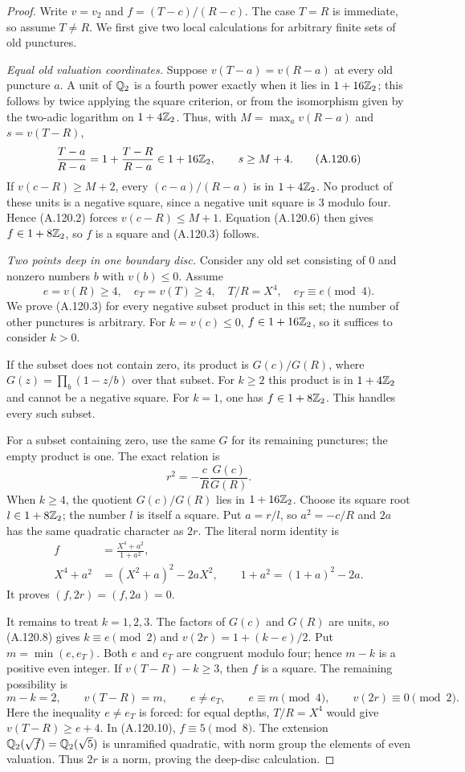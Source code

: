 \begin{proof}
Write $v=v_2$ and $f=(T-c)/(R-c)$.
The case $T=R$ is immediate, so assume $T\ne R$.
We first give two local calculations for arbitrary finite
sets of old punctures.

\emph{Equal old valuation coordinates.}
Suppose $v(T-a)=v(R-a)$ at every old puncture $a$.
A unit of $\mathbb Q_2$ is a fourth power exactly when it lies
in $1+16\mathbb Z_2$; this follows by twice applying the square
criterion, or from the isomorphism given by the two-adic
logarithm on $1+4\mathbb Z_2$.
Thus, with $M=\max_a v(R-a)$ and $s=v(T-R)$,
\[
       \frac{T-a}{R-a}=1+\frac{T-R}{R-a}\in1+16\mathbb Z_2,
                           \qquad s\ge M+4.
\tag{A.120.6}
\]
If $v(c-R)\ge M+2$, every $(c-a)/(R-a)$ is in
$1+4\mathbb Z_2$.  No product of these units is a negative
square, since a negative unit square is $3$ modulo four.
Hence (A.120.2) forces $v(c-R)\le M+1$.
Equation (A.120.6) then gives $f\in1+8\mathbb Z_2$, so $f$ is
a square and (A.120.3) follows.

\emph{Two points deep in one boundary disc.}
Consider any old set consisting of $0$ and nonzero numbers
$b$ with $v(b)\le0$.
Assume
\[
             e=v(R)\ge4,\quad e_T=v(T)\ge4,
             \quad T/R=X^4,\quad e_T\equiv e\pmod4.
\tag{A.120.7}
\]
We prove (A.120.3) for every negative subset product in
this set; the number of other punctures is arbitrary.
For $k=v(c)\le0$, $f\in1+16\mathbb Z_2$, so it suffices to
consider $k>0$.

If the subset does not contain zero, its product is
$G(c)/G(R)$, where
$G(z)=\prod_b(1-z/b)$ over that subset.
For $k\ge2$ this product is in $1+4\mathbb Z_2$ and cannot be
a negative square.  For $k=1$, one has $f\in1+8\mathbb Z_2$.
This handles every such subset.

For a subset containing zero, use the same $G$ for its
remaining punctures; the empty product is one.
The exact relation is
\[
                    r^2=-\frac cR\frac{G(c)}{G(R)}.
\tag{A.120.8}
\]
When $k\ge4$, the quotient $G(c)/G(R)$ lies in
$1+16\mathbb Z_2$.  Choose its square root $l\in1+8\mathbb Z_2$;
the number $l$ is itself a square.
Put $a=r/l$, so $a^2=-c/R$ and $2a$ has the same
quadratic character as $2r$.
The literal norm identity is
\[
 \begin{split}
 f&=\frac{X^4+a^2}{1+a^2},\\
 X^4+a^2&=(X^2+a)^2-2aX^2,
       \qquad 1+a^2=(1+a)^2-2a.
 \end{split}
\tag{A.120.9}
\]
It proves $(f,2r)=(f,2a)=0$.

It remains to treat $k=1,2,3$.
The factors of $G(c)$ and $G(R)$ are units, so
(A.120.8) gives $k\equiv e\pmod2$ and
$v(2r)=1+(k-e)/2$.
Put $m=\min(e,e_T)$.
Both $e$ and $e_T$ are congruent modulo four; hence
$m-k$ is a positive even integer.
If $v(T-R)-k\ge3$, then $f$ is a square.
The remaining possibility is
\[
 m-k=2,\qquad v(T-R)=m,\qquad
 e\ne e_T,\qquad e\equiv m\pmod4,
                       \qquad v(2r)\equiv0\pmod2.
\tag{A.120.10}
\]
Here the inequality $e\ne e_T$ is forced: for equal
depths, $T/R=X^4$ would give $v(T-R)\ge e+4$.
In (A.120.10), $f\equiv5\pmod8$.
The extension $\mathbb Q_2(\sqrt f)=\mathbb Q_2(\sqrt5)$ is unramified
quadratic, with norm group the elements of even valuation.
Thus $2r$ is a norm, proving the deep-disc calculation.


\end{proof}
